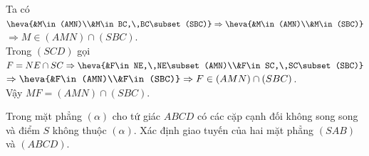 \begin{bt}
{\begin{enumerate}
				Ta có $\heva{&M\in (AMN)\\&M\in BC,\,BC\subset (SBC)}\Rightarrow \heva{&M\in (AMN)\\&M\in (SBC)}$\\
				$\Rightarrow M\in (AMN)\cap (SBC)$.\\
				Trong $(SCD)$ gọi $F=NE\cap SC\Rightarrow \heva{&F\in NE,\,NE\subset (AMN)\\&F\in SC,\,SC\subset (SBC)}$\\
				$\Rightarrow\heva{&F\in (AMN)\\&F\in (SBC)}\Rightarrow F\in (AMN)\cap (SBC)$.\\
				Vậy $MF=(AMN)\cap (SBC)$.
			\end{enumerate}
	}
\end{bt}

\begin{bt}%

	Trong mặt phẳng $\left(\alpha \right)$ cho tứ giác $ABCD$ có các cặp cạnh đối không song song và điểm $S$ không thuộc $\left(\alpha \right)$. Xác định giao tuyến của hai mặt phẳng $\left(SAB\right)$ và $\left(ABCD\right)$.
\end{bt}

